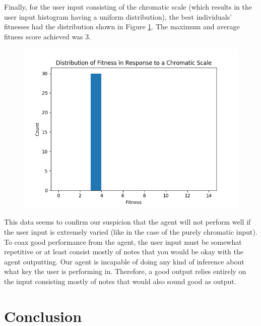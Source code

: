 \documentclass[conference]{IEEEtran}
\begin{document}
Finally, for the user input consisting of the chromatic scale (which results in the user input histogram having a uniform distribution), the best individuals' fitnesses had the distribution shown in Figure \ref{fig:chromaticdist}. The maximum and average fitness score achieved was 3.


\begin{figure}[H]
	\centering
	\includegraphics[width=0.8\linewidth]{chromaticDist}
	\caption{}
	\label{fig:chromaticdist}
\end{figure}

This data seems to confirm our suspicion that the agent will not perform well if the user input is extremely varied (like in the case of the purely chromatic input). To coax good performance from the agent, the user input must be somewhat repetitive or at least consist mostly of notes that you would be okay with the agent outputting. Our agent is incapable of doing any kind of inference about what key the user is performing in. Therefore, a good output relies entirely on the input consisting mostly of notes that would also sound good as output.





\section{Conclusion}
\end{document}
